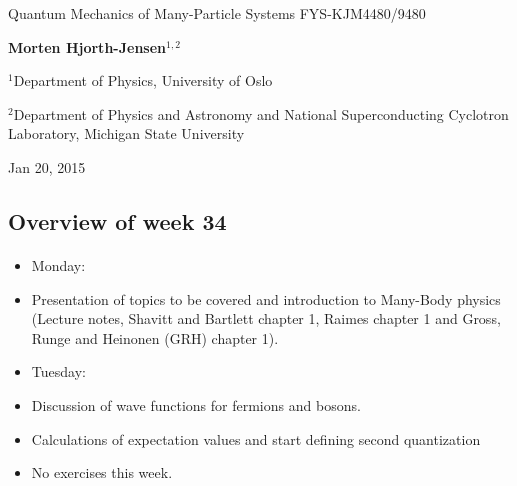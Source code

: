 \documentclass[%
twoside,                 %
final,                   %
10pt]{article}
\begin{document}






\thispagestyle{empty}

\begin{center}
{\LARGE\bf
\begin{spacing}{1.25}
Quantum Mechanics of Many-Particle Systems FYS-KJM4480/9480
\end{spacing}
}
\end{center}


\begin{center}
{\bf Morten Hjorth-Jensen${}^{1, 2}$} \\ [0mm]
\end{center}

    \begin{center}
\centerline{{\small ${}^1$Department of Physics, University of Oslo}}
\centerline{{\small ${}^2$Department of Physics and Astronomy and National Superconducting Cyclotron Laboratory, Michigan State University}}
\end{center}
    

\begin{center} %
Jan 20, 2015
\end{center}

\vspace{1cm}


\subsection{Overview of week 34}

\paragraph{}
\begin{itemize}
\item Monday:

\item Presentation of topics to be covered and introduction to Many-Body physics (Lecture notes, Shavitt and Bartlett chapter 1, Raimes chapter 1 and Gross, Runge and Heinonen (GRH) chapter 1).

\item Tuesday:

\item Discussion of wave functions for fermions and bosons.

\item Calculations of expectation values and start defining second quantization

\item No exercises this week.
\end{itemize}
\end{document}
